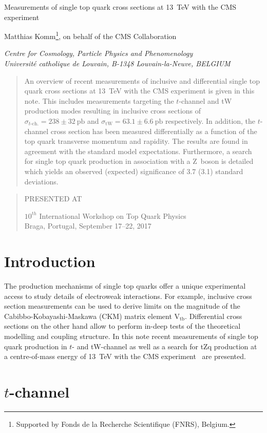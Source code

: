 \documentclass[12pt]{article}
\newcommand\pubnumber{}
\newcommand\pubdate{\today}
\def\institute{Centre for Cosmology, Particle Physics and Phenomenology\\
Universit\'e catholique de Louvain, B-1348 Louvain-la-Neuve, BELGIUM}
\def\support{\footnote{Supported by Fonds de la Recherche Scientifique (FNRS), Belgium.}}
\def\Title#1{\begin{center} {\Large #1 } \end{center}}
\def\Author#1{\begin{center}{ \sc #1} \end{center}}
\def\Address#1{\begin{center}{ \it #1} \end{center}}
\newcommand\pubblock{\rightline{\begin{tabular}{l} \pubnumber\\
         \pubdate  \end{tabular}}}
\newenvironment{Abstract}{\begin{quotation}  }{\end{quotation}}
\newenvironment{Presented}{\begin{quotation} \begin{center} 
             PRESENTED AT\end{center}\bigskip 
      \begin{center}\begin{large}}{\end{large}\end{center} \end{quotation}}
\begin{document}
\begin{titlepage}
\pubblock

\vfill
\Title{Measurements of single top quark cross sections at 13~TeV with the CMS experiment}
\vfill
\Author{Matthias Komm\support, on behalf of the CMS Collaboration}
\Address{\institute}
\vfill
\begin{Abstract}
An overview of recent measurements of inclusive and differential single top quark cross sections at 13~TeV with the CMS experiment is given in this note. This includes measurements targeting the $t$-channel and tW production modes resulting in inclusive cross sections of $\sigma_{t\mathrm{\mbox{-}ch.}}=238\pm32~\mathrm{pb}$ and $\sigma_\mathrm{tW}=63.1\pm6.6~\mathrm{pb}$ respectively. In addition, the $t$-channel cross section has been measured differentially as a function of the top quark transverse momentum and rapidity. The results are found in agreement with the standard model expectations. Furthermore, a search for single top quark production in association with a Z~boson is detailed which yields an observed (expected) significance of 3.7 (3.1) standard deviations. 
\end{Abstract}
\vfill
\begin{Presented}
$10^{th}$ International Workshop on Top Quark Physics\\
Braga, Portugal,  September 17--22, 2017
\end{Presented}
\vfill
\end{titlepage}
\def\thefootnote{\fnsymbol{footnote}}
\setcounter{footnote}{0}
%

\section{Introduction}

The production mechanisms of single top quarks offer a unique experimental access to study details of electroweak interactions. For example, inclusive cross section measurements can be used to derive limits on the magnitude of the Cabibbo-Kobayashi-Maskawa (CKM) matrix element $\mathrm{V}_\mathrm{tb}$. Differential cross sections on the other hand allow to perform in-deep tests of the theoretical modelling and coupling structure. In this note recent measurements of single top quark production in $t$- and tW-channel as well as a search for tZq production at a centre-of-mass energy of 13~TeV with the CMS experiment~\cite{cms} are presented.


\section{$t$-channel}
\end{document}
